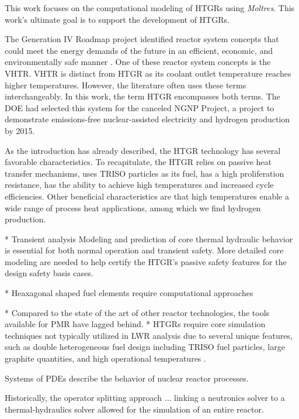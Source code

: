 \documentclass[11pt,letterpaper]{article}
\begin{document}
This work focuses on the computational modeling of \glspl{HTGR} using \textit{Moltres}.
This work's ultimate goal is to support the development of \glspl{HTGR}.

The Generation IV Roadmap project identified reactor system concepts that could meet the energy demands of the future in an efficient, economic, and environmentally safe manner \cite{macdonald_ngnp_2003}.
One of these reactor system concepts is the \gls{VHTR}.
\gls{VHTR} is distinct from \gls{HTGR} as its coolant outlet temperature reaches higher temperatures.
However, the literature often uses these terms interchangeably.
In this work, the term \gls{HTGR} encompasses both terms.
The \gls{DOE} had selected this system for the canceled \gls{NGNP} Project, a project to demonstrate emissions-free nuclear-assisted electricity and hydrogen production by 2015.

As the introduction has already described, the \gls{HTGR} technology has several favorable characteristics.
To recapitulate, the \gls{HTGR} relies on passive heat transfer mechanisms, uses TRISO particles as its fuel, has a high proliferation resistance, has the ability to achieve high temperatures and increased cycle efficiencies.
Other beneficial characteristics are that high temperatures enable a wide range of process heat applications, among which we find hydrogen production.


* Transient analysis
Modeling and prediction of core thermal hydraulic behavior is essential for both normal operation and transient safety.
More detailed core modeling are needed to help certify the \gls{HTGR}’s passive safety features for the design safety basis cases.

* Heaxagonal shaped fuel elements require computational approaches

* Compared to the state of the art of other reactor technologies, the tools available for \gls{PMR} have lagged behind.
* \glspl{HTGR} require core simulation techniques not typically utilized in \gls{LWR} analysis due to several unique features, such as double heterogeneous fuel design including \gls{TRISO} fuel particles, large graphite quantities, and high operational temperatures \cite{bostelmann_criticality_2016}.


Systems of \glspl{PDE} describe the behavior of nuclear reactor processes.

Historically, the operator splitting approach ...
linking a neutronics solver to a thermal-hydraulics solver allowed for the simulation of an entire reactor.
\end{document}
